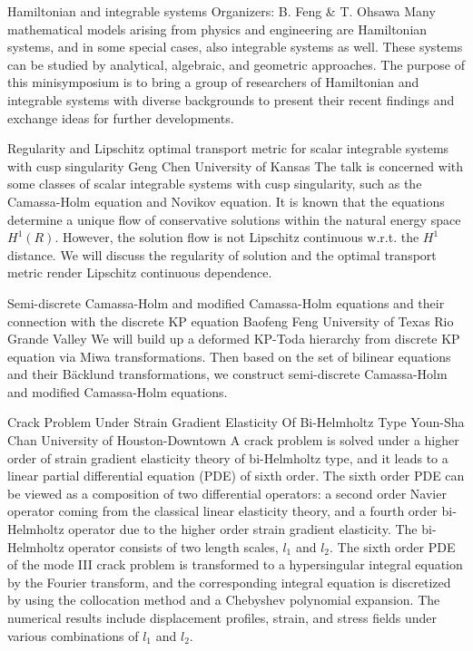 \label{mini11}

\miniabs
{Hamiltonian and integrable systems}
{Organizers: B. Feng \& T. Ohsawa}
{Many mathematical models arising from physics and engineering are Hamiltonian systems, and in some special cases, also integrable systems as well. These systems can be studied by analytical, algebraic, and geometric approaches. The purpose of this minisymposium is to bring a group of researchers of Hamiltonian and integrable systems with diverse backgrounds to present their recent findings and exchange ideas for further developments.}

\begin{addmargin}[2em]{0em}
\vspace{2ex}
\abs
{Regularity and Lipschitz optimal transport metric for scalar integrable systems with cusp singularity}
{Geng Chen}
{University of Kansas}
{The talk is concerned with some classes of scalar integrable systems with cusp singularity, such as the Camassa-Holm equation and Novikov equation. It is known that the equations determine a unique flow of conservative solutions within the natural energy space $H^1(R)$. However, the solution flow is not Lipschitz continuous w.r.t. the $H^1$ distance. We will discuss the regularity of solution and the optimal transport metric render Lipschitz continuous dependence.}


\vspace{1.5ex}
\abs
{Semi-discrete Camassa-Holm and modified Camassa-Holm equations and their connection with the discrete KP equation}
{Baofeng Feng}
{University of Texas Rio Grande Valley}
{We will build up a deformed KP-Toda hierarchy from discrete KP equation via Miwa transformations. Then based on the set of bilinear equations and their B{\"a}cklund transformations, we construct semi-discrete Camassa-Holm and modified Camassa-Holm equations.}


\vspace{1.5ex}
\abs
{Crack Problem Under Strain Gradient Elasticity Of Bi-Helmholtz Type}
{Youn-Sha Chan}
{University of Houston-Downtown}
{A crack problem is solved under a higher order of strain gradient elasticity theory of bi-Helmholtz type, and it leads to a linear partial differential equation (PDE) of sixth order. The sixth order PDE can be viewed as a composition of two differential operators: a second order Navier operator coming from the classical linear elasticity theory, and a fourth order bi-Helmholtz operator due to the higher order strain gradient elasticity. The bi-Helmholtz operator consists of two length scales, $l_1$ and $l_2$. The sixth order PDE of the mode III crack problem is transformed to a hypersingular integral equation by the Fourier transform, and the corresponding integral equation is discretized by using the collocation method and a Chebyshev polynomial expansion. The numerical results include displacement profiles, strain, and stress fields under various combinations of $l_1$ and $l_2$.
}


\end{addmargin}
